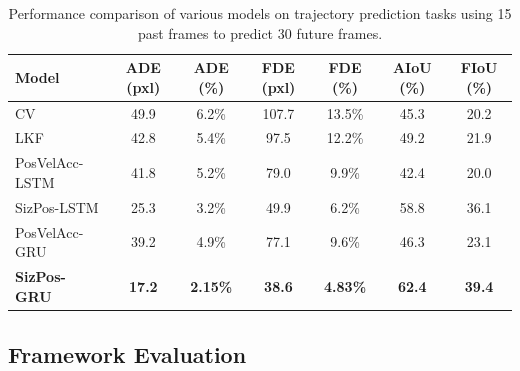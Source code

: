 \documentclass[12pt,oneside]{book} %
\begin{document}
\begin{table}[H]
    \centering
    \caption{Performance comparison of various models on trajectory prediction tasks using 15 past frames to predict 30 future frames.}
    \begin{adjustbox}{max width=\textwidth}
        \begin{tabular}{lcccccc}
            \toprule
            \textbf{Model}                      & \textbf{ADE (pxl)} & \textbf{ADE (\%)} & \textbf{FDE (pxl)} & \textbf{FDE (\%)} & \textbf{AIoU (\%)} & \textbf{FIoU (\%)} \\ 
            \midrule
            CV~\cite{MultipleObjectForecasting} & 49.9               & 6.2\%             & 107.7              & 13.5\%            & 45.3               & 20.2               \\ 
            LKF~\cite{kalman1960new}            & 42.8               & 5.4\%             & 97.5               & 12.2\%            & 49.2               & 21.9               \\ 
            \hdashline
            PosVelAcc-LSTM                      & 41.8               & 5.2\%             & 79.0               & 9.9\%             & 42.4               & 20.0               \\ 
            SizPos-LSTM                         & 25.3               & 3.2\%             & 49.9               & 6.2\%             & 58.8               & 36.1               \\ 
            PosVelAcc-GRU                       & 39.2               & 4.9\%             & 77.1               & 9.6\%             & 46.3               & 23.1               \\ 
            \textbf{SizPos-GRU}                 & \textbf{17.2}      & \textbf{2.15\%}   & \textbf{38.6}      & \textbf{4.83\%}   & \textbf{62.4}      & \textbf{39.4}      \\ 
            \bottomrule
        \end{tabular}
    \end{adjustbox}
    \label{tab:fusion-gru-results-30frames}
\end{table}

\newpage
\subsection{Framework Evaluation}
\end{document}
